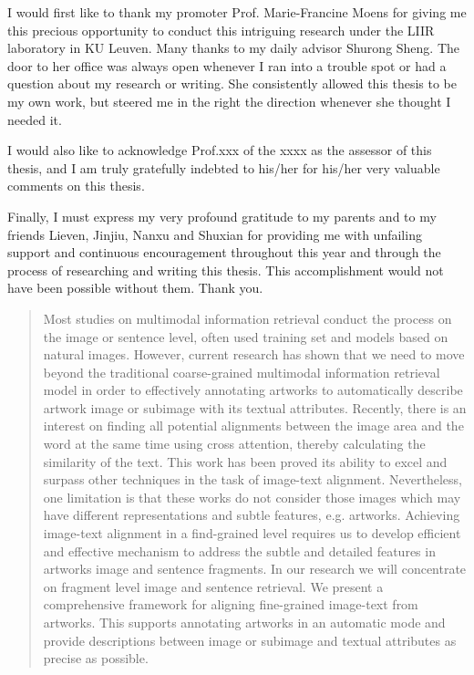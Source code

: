 \documentclass[master=mai,masteroption=bda]{kulemt}
\begin{document}
\begin{preface}
I would first like to thank my promoter Prof. Marie-Francine Moens for giving me this precious opportunity to conduct this intriguing research under the LIIR laboratory in KU Leuven. Many thanks to my daily advisor Shurong Sheng. The door to her office was always open whenever I ran into a trouble spot or had a question about my research or writing. She consistently allowed this thesis to be my own work, but steered me in the right the direction whenever she thought I needed it.

I would also like to acknowledge Prof.xxx of the xxxx as the assessor of this thesis, and I am truly gratefully indebted to his/her for his/her very valuable comments on this thesis.

Finally, I must express my very profound gratitude to my parents and to my friends Lieven, Jinjiu, Nanxu and Shuxian for providing me with unfailing support and continuous encouragement throughout this year and through the process of researching and writing this thesis. This accomplishment would not have been possible without them. Thank you.

\end{preface}

\tableofcontents*

\begin{abstract}
Most studies on multimodal information retrieval conduct the process on the image or sentence level, often used training set and models based on natural images. However, current research has shown that we need to move beyond the traditional coarse-grained multimodal information retrieval model in order to effectively annotating artworks to automatically describe artwork image or subimage with its textual attributes. Recently, there is an interest on finding all potential alignments between the image area and the word at the same time using cross attention, thereby calculating the similarity of the text. This work has been proved its ability to excel and surpass other techniques in the task of image-text alignment. Nevertheless, one limitation is that these works do not consider those images which may have different representations and subtle features, e.g. artworks. Achieving image-text alignment in a find-grained level requires us to develop efficient and effective mechanism to address the subtle and detailed features in artworks image and sentence fragments. In our research we will concentrate on fragment level image and sentence retrieval. We present a comprehensive framework for aligning fine-grained image-text from artworks. This supports annotating artworks in an automatic mode and provide descriptions between image or subimage and textual attributes as precise as possible.

\end{abstract}
\end{document}
